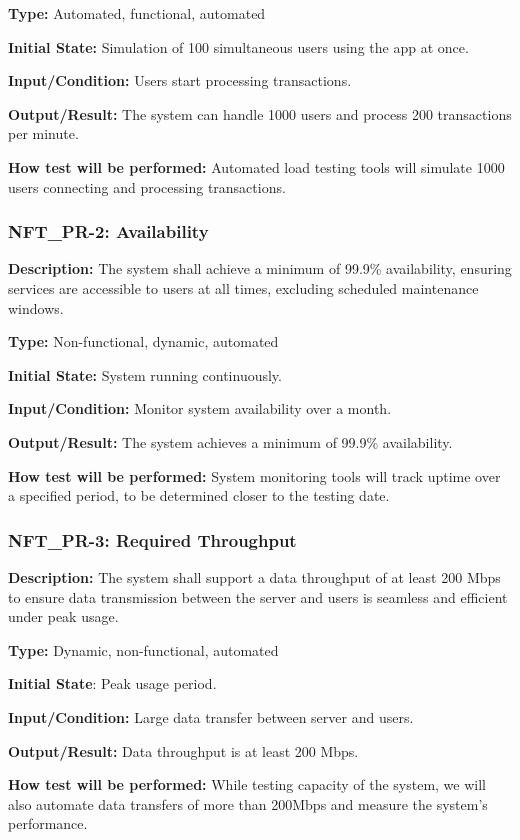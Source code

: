 \documentclass[12pt, titlepage]{article}
\begin{document}
\textbf{Type: }Automated, functional, automated

\textbf{Initial State:} Simulation of 100 simultaneous users using the app at once. 

\textbf{Input/Condition: }Users start processing transactions.

\textbf{Output/Result:} The system can handle 1000 users and process 200 transactions per minute.

\textbf{How test will be performed:} Automated load testing tools will simulate 1000 users connecting and processing transactions.


\subsubsection*{\textbf{NFT\_PR-2: Availability}
}

\textbf{Description: }The system shall achieve a minimum of 99.9\% availability, ensuring services are accessible to users at all times, excluding scheduled maintenance windows.

\textbf{Type: }Non-functional, dynamic, automated

\textbf{Initial State: }System running continuously.

\textbf{Input/Condition: }Monitor system availability over a month.

\textbf{Output/Result:} The system achieves a minimum of 99.9\% availability.

\textbf{How test will be performed:} System monitoring tools will track uptime over a specified period, to be determined closer to the testing date. 

\subsubsection*{\textbf{NFT\_PR-3: Required Throughput}}

\textbf{Description: }The system shall support a data throughput of at least 200 Mbps to ensure data transmission between the server and users is seamless and efficient under peak usage.

\textbf{Type: }Dynamic, non-functional, automated

\textbf{Initial State}: Peak usage period.

\textbf{Input/Condition:} Large data transfer between server and users.

\textbf{Output/Result: }Data throughput is at least 200 Mbps.

\textbf{How test will be performed:} While testing capacity of the system, we will also automate data transfers of more than 200Mbps and measure the system’s performance. 
\end{document}
